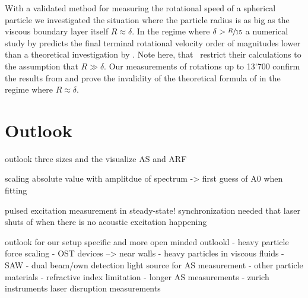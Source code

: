With a validated method for measuring the rotational speed of a spherical 
particle we investigated the situation where the particle radius is as big as 
the viscous boundary layer itself $R\approx\delta$. In the regime where $\delta 
> \sfrac{R}{15}$ a numerical study by  predicts the final 
terminal rotational velocity order of magnitudes lower than a theoretical 
investigation by . Note here, that~\cite{Lamprecht2015} 
restrict their calculations to the assumption that $R\gg\delta$. Our 
measurements of rotations up to \SI{13'700}{\rpm} confirm the results from 
 and prove the invalidity of the theoretical formula of 
 in the regime where $R\approx\delta$.

\section{Outlook}

outlook three sizes and the visualize AS and ARF

scaling absolute value with amplitdue of spectrum -> first guess of A0 when 
fitting

pulsed excitation measurement in steady-state! synchronization needed that 
laser shuts of when there is no acoustic excitation happening

outlook for our setup specific and more open minded outlookl
 - heavy particle force scaling
 - OST devices --> near walls
 - heavy particles in viscous fluids
 - SAW
 - dual beam/own detection light source for AS measurement
 - other particle materials
 - refractive index limitation
 - longer AS measurements
 - zurich instruments laser disruption measurements
